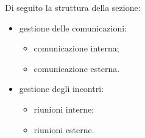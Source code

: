  Di seguito la struttura della sezione:
\begin{itemize}
	\item gestione delle comunicazioni:
	\begin{itemize}
		\item comunicazione interna;
		\item comunicazione esterna.
	\end{itemize}
	\item gestione degli incontri:
	\begin{itemize}
		\item riunioni interne;
		\item riunioni esterne.
	\end{itemize}
\end{itemize}